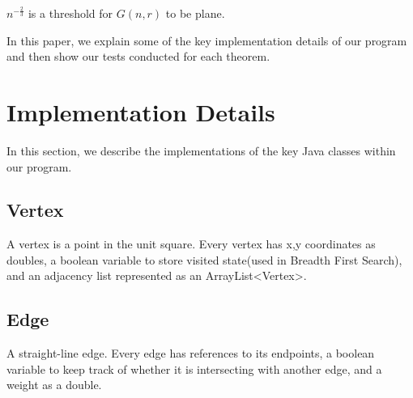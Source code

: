 \documentclass{article}
\newcommand{\dg}{G(n,r)}
\newenvironment{customthm}[1]{\renewcommand\theinnercustomthm{#1}\innercustomthm}{\endinnercustomthm}
\begin{document}
\begin{customthm}{4}
\label{plane-thr}
$n^{-\frac{2}{3}}$ is a threshold for $\dg$ to be plane.
\end{customthm}

In this paper, we explain some of the key implementation details of our program and then show our tests conducted for each theorem.

\newpage
\section{Implementation Details}
In this section, we describe the implementations of the key Java classes within our program.

\subsection*{Vertex}
A vertex is a point in the unit square. Every vertex has x,y coordinates as doubles, a boolean variable to store visited state(used in Breadth First Search), and an adjacency list represented as an ArrayList\textless Vertex\textgreater.

\subsection*{Edge}
A straight-line edge. Every edge has references to its endpoints, a boolean variable to keep track of whether it is intersecting with another edge, and a weight as a double.
\end{document}
